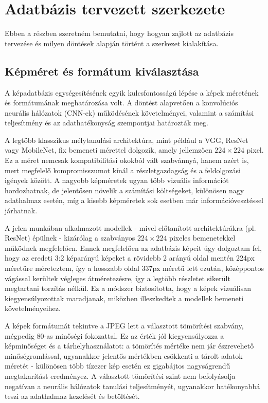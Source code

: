     \section{Adatbázis tervezett szerkezete}
        Ebben a részben szeretném bemutatni, hogy hogyan zajlott az adatbázis tervezése és milyen döntések alapján történt a szerkezet kialakítása.

        \subsection{Képméret és formátum kiválasztása}
            A képadatbázis egységesítésének egyik kulcsfontosságú lépése a képek méretének és formátumának meghatározása volt. A döntést alapvetően a konvolúciós neurális hálózatok (CNN-ek) működésének követelményei, valamint a számítási teljesítmény és az adathatékonyság szempontjai határozták meg.
            
            A legtöbb klasszikus mélytanulási architektúra, mint például a VGG, ResNet vagy MobileNet, fix bemeneti mérettel dolgozik, amely jellemzően $224\times224$ pixel. Ez a méret nemcsak kompatibilitási okokból vált szabvánnyá, hanem azért is, mert megfelelő kompromisszumot kínál a részletgazdagság és a feldolgozási igények között. A nagyobb képméretek ugyan több vizuális információt hordozhatnak, de jelentősen növelik a számítási költségeket, különösen nagy adathalmaz esetén, míg a kisebb képméretek sok esetben már információvesztéssel járhatnak.
            
            A jelen munkában alkalmazott modellek - mivel előtanított architektúrákra (pl. ResNet) épülnek - kizárólag a szabványos $224\times224$ pixeles bemenetekkel működnek megfelelően. Ennek megfelelően az adatbázis képeit úgy dolgoztam fel, hogy az eredeti 3:2 képarányú képeket a rövidebb 2 arányú oldal mentén 224px méretűre méreteztem, így a hosszabb oldal 337px méretű lett ezután, középpontos vágással kerültek végleges átméretezésre, így a legtöbb részletet sikerült megtartani torzítás nélkül. Ez a módszer biztosította, hogy a képek vizuálisan kiegyensúlyozottak maradjanak, miközben illeszkedtek a modellek bemeneti követelményeihez.
            
            A képek formátumát tekintve a JPEG lett a választott tömörítési szabvány, mégpedig 80-as minőségi fokozattal. Ez az érték jól kiegyensúlyozza a képminőséget és a tárhelyhasználatot: a tömörítés mértéke nem jár észrevehető minőségromlással, ugyanakkor jelentős mértékben csökkenti a tárolt adatok méretét - különösen több tízezer kép esetén ez gigabájtos nagyságrendű megtakarítást eredményez. A választott tömörítési szint nem befolyásolja negatívan a neurális hálózatok tanulási teljesítményét, ugyanakkor hatékonyabbá teszi az adathalmaz kezelését és betöltését.
            
